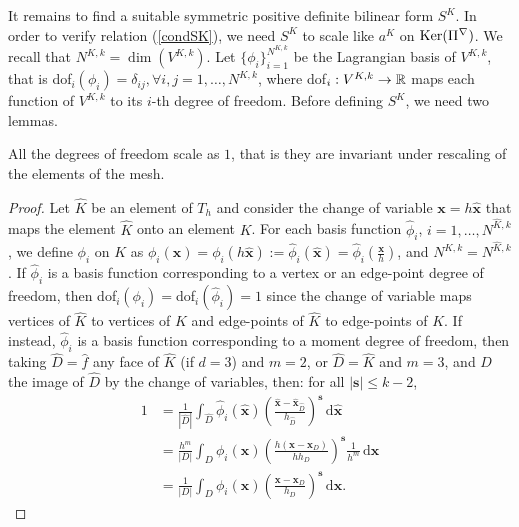 It remains to find a suitable symmetric positive definite bilinear form $S^K$. In order to verify relation (\ref{condSK}), we need $S^K$ to scale like $a^K$ on ${\rm Ker}(\Pi^\nabla)$. We recall that $N^{K,k} = \dim(V^{K,k})$. Let $\{\phi_i\}_{i=1}^{N^{K,k}}$ be the Lagrangian basis of $V^{K,k}$, that is dof$_i(\phi_i)=\delta_{ij}, \forall i,j=1,\ldots,N^{K,k}$, where dof$_i:V^{K,k}\rightarrow \mathbb{R}$ maps each function of $V^{K,k}$ to its $i$-th degree of freedom. Before defining $S^K$, we need two lemmas.

\begin{lemma}\label{lemma1}
All the degrees of freedom scale as $1$, that is they are invariant under rescaling of the elements of the mesh. 
\end{lemma}
\begin{proof}
Let $\hat{K}$ be an element of $T_h$ and consider the change of variable $\mathbf{x}=h\hat{\mathbf{x}}$ that maps the element $\hat{K}$ onto an element $K$. For each basis function $\hat{\phi}_i$, $i=1,\ldots,N^{\hat{K},k}$, we define $\phi_i$ on $K$ as $\phi_i(\mathbf{x}) = \phi_i(h\mathbf{\hat{x}}) := \hat{\phi}_i(\hat{\mathbf{x}}) = \hat{\phi}_i\left(\frac{\mathbf{x}}{h}\right)$, and $N^{K,k}=N^{\hat{K},k}$. If $\hat{\phi}_i$ is a basis function corresponding to a vertex or an edge-point degree of freedom, then dof$_i(\phi_i)=$dof$_i(\hat{\phi}_i) = 1$ since the change of variable maps vertices of $\hat{K}$ to vertices of $K$ and edge-points of $\hat{K}$ to edge-points of $K$. If instead, $\hat{\phi}_i$ is a basis function corresponding to a moment degree of freedom, then taking $\hat{D}=\hat{f}$ any face of $\hat{K}$ (if $d=3$) and $m=2$, or $\hat{D}=\hat{K}$ and $m=3$, and $D$ the image of $\hat{D}$ by the change of variables, then: for all $|\mathbf{s}|\leq k-2$, 
\begin{align*}
1&=\frac{1}{|\hat{D}|}\int_{\hat{D}} \hat{\phi}_i(\mathbf{\hat{x}}) \left(\frac{\mathbf{\hat{x}}-\mathbf{\hat{x}}_{\hat{D}}}{h_{\hat{D}}}\right)^\mathbf{s}\,\mathrm{d}\mathbf{\hat{x}} \\
&= \frac{h^m}{|D|}\int_D \phi_i(\mathbf{x})\left(\frac{ h\left(\mathbf{x}-\mathbf{x}_D\right)}{hh_D}\right)^\mathbf{s}\frac{1}{h^m}\,\mathrm{d}\mathbf{x} \\
&= \frac{1}{|D|} \int_D \phi_i(\mathbf{x})\left(\frac{\mathbf{x}-\mathbf{x}_D}{h_D}\right)^\mathbf{s}\,\mathrm{d}\mathbf{x}.
\end{align*} 
\end{proof}

